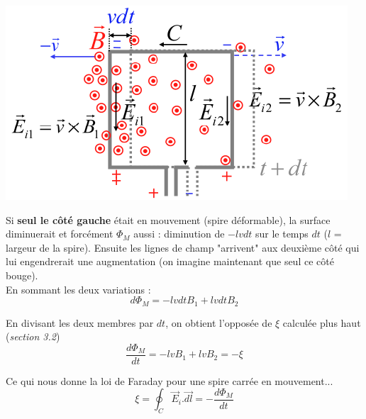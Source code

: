 \documentclass	[11pt, a4paper, openany]{book}
\begin{document}
\begin{center}
	\includegraphics[scale=0.45]{em/image10.png}\\
\end{center}
Si \textbf{seul le côté gauche} était en mouvement (spire déformable), la surface diminuerait et forcément $\Phi_M$ aussi : diminution de $-lvdt$ sur le temps $dt$ ($l$ = largeur de la spire). Ensuite les lignes de champ "arrivent" aux deuxième côté qui lui engendrerait une augmentation (on imagine maintenant que seul ce côté bouge). \\
En sommant les deux variations : 
\begin{equation}
	d\Phi_M = -lvdtB_1 + lvdtB_2
\end{equation}

En divisant les deux membres par $dt$, on obtient l'opposée de $\xi$ calculée plus haut (\textit{section 3.2})
\begin{equation}
	\frac{d\Phi_M}{dt} = -lvB_1 + lvB_2 = - \xi
\end{equation}

Ce qui nous donne la loi de Faraday pour une spire carrée en  mouvement...
\begin{equation}
	\xi = \oint_C \vec{E}_i.\vec{dl} = - \frac{d\Phi_M}{dt}
\end{equation}
\end{document}
